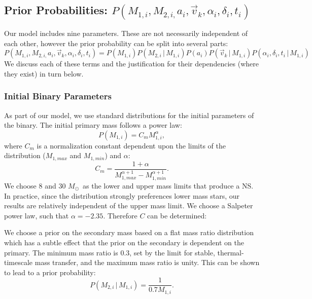 \documentclass[12pt, preprint]{aastex}
\newcommand{\given}{\,|\,}
\newcommand{\Msun}{\ifmmode {M_{\odot}}\else${M_{\odot}}$\fi}
\begin{document}
\subsection{Prior Probabilities: $P(M_{1,i}, M_{2,i,} a_i, \vec{v}_k, \alpha_i, \delta_i, t_i)$} \label{sec:priors}


Our model includes nine parameters. These are not necessarily independent of each other, however the prior probability can be split into several parts:
\begin{equation}
P(M_{1,i}, M_{2,i,} a_i, \vec{v}_k, \alpha_i, \delta_i, t_i) = P(M_{1,i}) P(M_{2,i} \given M_{1,i}) P(a_i) P(\vec{v}_k \given M_{1,i}) P(\alpha_i, \delta_i, t_i \given M_{1,i})
\end{equation}
We discuss each of these terms and the justification for their dependencies (where they exist) in turn below.

\subsubsection{Initial Binary Parameters}

As part of our model, we use standard distributions for the initial parameters of the binary. The initial primary mass follows a power law:
\begin{equation}
P(M_{1,i}) = C_m M_{1,i}^{\alpha},
\end{equation}
where $C_m$ is a normalization constant dependent upon the limits of the distribution ($M_{1,max}$ and $M_{1,min}$) and $\alpha$:
\begin{equation}
C_m = \frac{1 + \alpha}{M_{1,max}^{\alpha+1} - M_{1,min}^{\alpha+1}}.
\end{equation}
We choose 8 and 30 \Msun\ as the lower and upper mass limits that produce a NS. In practice, since the distribution strongly preferences lower mass stars, our results are relatively independent of the upper mass limit. We choose a Salpeter power law, such that $\alpha = -2.35$. Therefore $C$ can be determined:

We choose a prior on the secondary mass based on a flat mass ratio distribution which has a subtle effect that the prior on the secondary is dependent on the primary. The minimum mass ratio is 0.3, set by the limit for stable, thermal-timescale mass transfer, and the maximum mass ratio is unity. This can be shown to lead to a prior probability:
\begin{equation}
P(M_{2,i} \given M_{1,i}) = \frac{1}{0.7 M_{1,i}}.
\end{equation}
\end{document}
